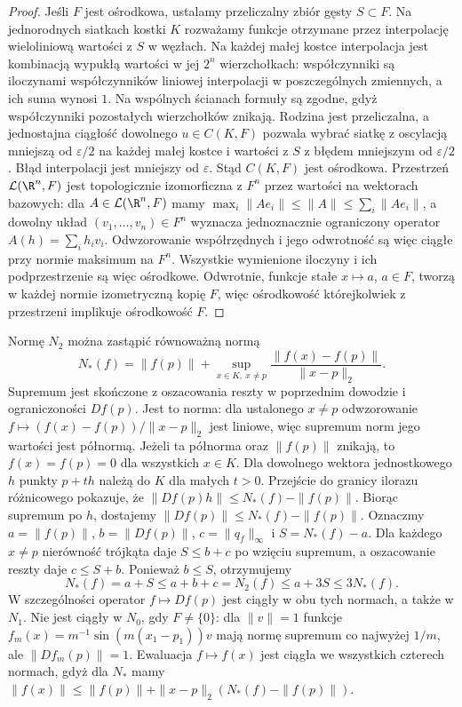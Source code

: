 \begin{proof}
Jeśli $F$ jest ośrodkowa, ustalamy przeliczalny
zbiór gęsty $S\subset F$. Na jednorodnych
siatkach kostki $K$ rozważamy funkcje
otrzymane przez interpolację wieloliniową
wartości z $S$ w węzłach. Na każdej małej
kostce interpolacja jest kombinacją wypukłą
wartości w jej $2^n$ wierzchołkach: współczynniki
są iloczynami współczynników liniowej interpolacji
w poszczególnych zmiennych, a ich suma wynosi $1$.
Na wspólnych ścianach formuły są zgodne, gdyż
współczynniki pozostałych wierzchołków znikają.
Rodzina jest przeliczalna, a jednostajna ciągłość
dowolnego $u\in C(K,F)$ pozwala wybrać siatkę
z oscylacją mniejszą od $\varepsilon/2$ na
każdej małej kostce i wartości z $S$
z błędem mniejszym od $\varepsilon/2$.
Błąd interpolacji jest mniejszy od $\varepsilon$.
Stąd $C(K,F)$ jest ośrodkowa.
Przestrzeń $\mathcal L(\R^n,F)$ jest topologicznie
izomorficzna z $F^n$ przez wartości na wektorach
bazowych: dla $A\in\mathcal L(\R^n,F)$ mamy
$\max_i\|Ae_i\|\le\|A\|\le\sum_i\|Ae_i\|$,
a dowolny układ $(v_1,\ldots,v_n)\in F^n$ wyznacza
jednoznacznie ograniczony operator $A(h)=\sum_i h_i v_i$.
Odwzorowanie współrzędnych i jego odwrotność są więc
ciągłe przy normie maksimum na $F^n$. Wszystkie wymienione iloczyny
i ich podprzestrzenie są więc ośrodkowe.
Odwrotnie, funkcje stałe $x\mapsto a$, $a\in F$,
tworzą w każdej normie izometryczną kopię $F$,
więc ośrodkowość którejkolwiek z przestrzeni
implikuje ośrodkowość $F$.
\end{proof}

Normę $N_2$ można zastąpić równoważną normą
\[
 N_*(f)=\|f(p)\|+
 \sup_{x\in K,\ x\ne p}
 \frac{\|f(x)-f(p)\|}{\|x-p\|_2}.
\]
Supremum jest skończone z oszacowania reszty
w poprzednim dowodzie i ograniczoności $Df(p)$.
Jest to norma: dla ustalonego $x\ne p$ odwzorowanie
$f\mapsto(f(x)-f(p))/\|x-p\|_2$ jest liniowe,
więc supremum norm jego wartości jest półnormą.
Jeżeli ta półnorma oraz $\|f(p)\|$ znikają,
to $f(x)=f(p)=0$ dla wszystkich $x\in K$.
Dla dowolnego wektora jednostkowego $h$
punkty $p+th$ należą do $K$ dla małych $t>0$.
Przejście do granicy ilorazu różnicowego pokazuje,
że $\|Df(p)h\|\le N_*(f)-\|f(p)\|$.
Biorąc supremum po $h$, dostajemy
$\|Df(p)\|\le N_*(f)-\|f(p)\|$.
Oznaczmy $a=\|f(p)\|$, $b=\|Df(p)\|$,
$c=\|q_f\|_\infty$ i $S=N_*(f)-a$.
Dla każdego $x\ne p$ nierówność trójkąta
daje $S\le b+c$ po wzięciu supremum,
a oszacowanie reszty daje $c\le S+b$.
Ponieważ $b\le S$, otrzymujemy
\[
 N_*(f)=a+S\le a+b+c=N_2(f)
 \le a+3S\le3N_*(f).
\]
W szczególności operator $f\mapsto Df(p)$
jest ciągły w obu tych normach, a także w $N_1$.
Nie jest ciągły w $N_0$, gdy $F\ne\{0\}$:
dla $\|v\|=1$ funkcje
$f_m(x)=m^{-1}\sin(m(x_1-p_1))v$
mają normę supremum co najwyżej $1/m$,
ale $\|Df_m(p)\|=1$.
Ewaluacja $f\mapsto f(x)$ jest ciągła we
wszystkich czterech normach, gdyż dla
$N_*$ mamy $\|f(x)\|\le\|f(p)\|
+\|x-p\|_2(N_*(f)-\|f(p)\|)$.

